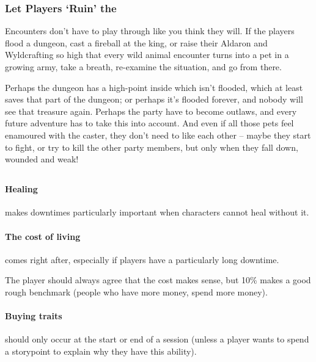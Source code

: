 \begin{multicols}{2}
\subsubsection{Let Players `Ruin' the }

Encounters don't have to play through like you think they will.
If the players flood a dungeon, cast a fireball at the king, or raise their Aldaron and Wyldcrafting so high that every wild animal encounter turns into a pet in a growing army, take a breath, re-examine the situation, and go from there.

Perhaps the dungeon has a high-point inside which isn't flooded, which at least saves that part of the dungeon; or perhaps it's flooded forever, and nobody will see that treasure again.
Perhaps the party have to become outlaws, and every future adventure has to take this into account.
And even if all those pets feel enamoured with the caster, they don't need to like each other -- maybe they start to fight, or try to kill the other party members, but only when they fall down, wounded and weak!

\subsection{}

\paragraph{Healing}
makes \glspl{downtime} particularly important when characters cannot heal without it.

\paragraph{The cost of living}
comes right after, especially if players have a particularly long \gls{downtime}.

The player should always agree that the cost makes sense, but 10\% makes a good rough benchmark (people who have more money, spend more money).

\paragraph{Buying traits}
should only occur at the start or end of a session (unless a player wants to spend a \gls{storypoint} to explain why they have this ability).



\end{multicols}

